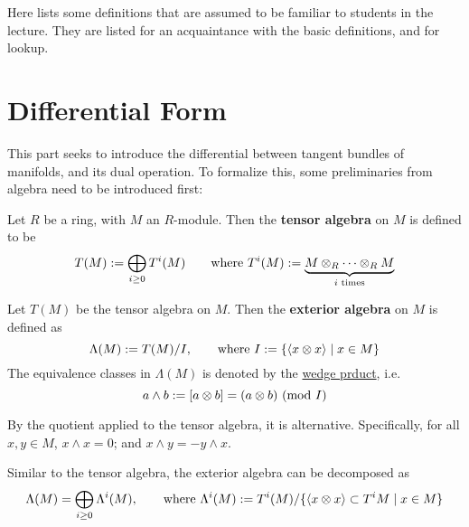 \documentclass{article}
\begin{document}

\tableofcontents
\newpage

Here lists some definitions that are assumed to be familiar to students in the lecture. They are listed for an acquaintance with the basic definitions, and for lookup.

\section{Differential Form}

This part seeks to introduce the differential between tangent bundles of manifolds, and its dual operation. To formalize this, some preliminaries from algebra need to be introduced first:

\begin{definition}
    Let $R$ be a ring, with $M$ an $R$-module. Then the \textbf{tensor algebra} on $M$ is defined to be
    \[
        T(M) := \bigoplus_{i \geq 0} T^i(M) \qquad\text{where } T^i(M) := \underbrace{M \otimes_R \cdots \otimes_R M}_{i \text{ times}}
    \]
\end{definition}

\begin{definition}
    Let $T(M)$ be the tensor algebra on $M$. Then the \textbf{exterior algebra} on $M$ is defined as
    \[
        \Lambda(M) := T(M) / I , \qquad \text{where } I := \left\{ \left\langle x \otimes x \right\rangle \mid x \in M \right\}
    \]
    The equivalence classes in $\Lambda(M)$ is denoted by the \underline{wedge prduct}, i.e.
    \[
        a \wedge b := [a \otimes b] = (a \otimes b) \ (\text{mod}\ I)
    \]
\end{definition}

\begin{remark}
    By the quotient applied to the tensor algebra, it is alternative. Specifically, for all $x, y \in M$, $x \wedge x = 0$; and $x \wedge y = -y \wedge x$.
\end{remark}

\begin{remark}
    Similar to the tensor algebra, the exterior algebra can be decomposed as
    \[
        \Lambda(M) = \bigoplus_{i \geq 0} \Lambda^i(M), \qquad \text{where } \Lambda^i(M) := T^i(M) / \{ \left\langle x \otimes x \right\rangle \subset T^i M \mid x \in M \}
    \]
\end{remark}
\end{document}
